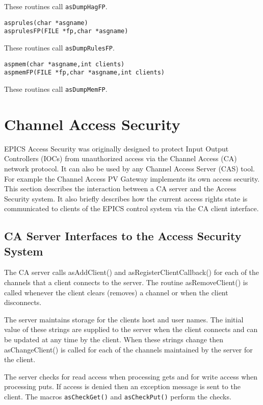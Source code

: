 These routines call \verb|asDumpHagFP|.

\begin{verbatim}
asprules(char *asgname)
asprulesFP(FILE *fp,char *asgname)
\end{verbatim}

These routines call \verb|asDumpRulesFP|.

\begin{verbatim}
aspmem(char *asgname,int clients)
aspmemFP(FILE *fp,char *asgname,int clients)
\end{verbatim}

These routines call \verb|asDumpMemFP|.

\section{Channel Access Security}

EPICS Access Security was originally designed to protect Input Output Controllers (IOCs) from unauthorized access via 
the Channel Access (CA) network protocol. It can also be used by any Channel Access Server (CAS) tool. For example 
the Channel Access PV Gateway implements its own access security. This  section describes the interaction between a CA 
server and the Access Security system. It also briefly describes how the current access rights state is communicated to 
clients of the EPICS control system via the CA client interface.

\subsection{CA Server Interfaces to the Access Security System}

The CA server calls asAddClient() and asRegisterClientCallback() for each of the channels that a client 
connects to the server. The routine asRemoveClient() is called whenever the client clears (removes) a channel or 
when the client disconnects. 

The server maintains storage for the clients host and user names. The initial value of these strings are supplied to the 
server when the client connects and can be updated at any time by the client. When these strings change then 
asChangeClient() is called for each of the channels maintained by the server for the client.

The server checks for read access when processing gets and for write access when processing puts. If access is denied 
then an exception message is sent to the client. The macros \verb|asCheckGet()| and \verb|asCheckPut()| perform the checks.

